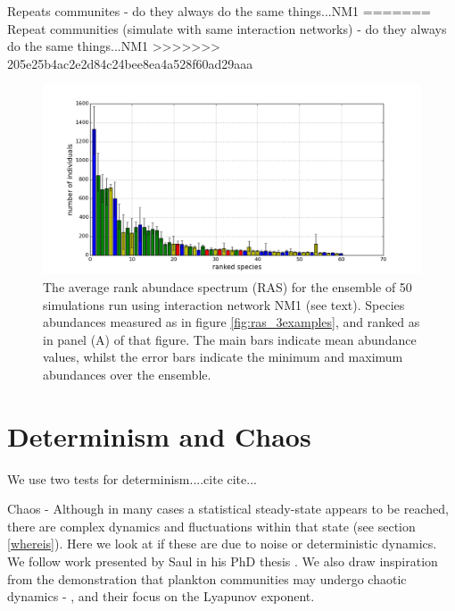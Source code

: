 Repeats communites - do they always do the same things...NM1
=======
Repeat communities (simulate with same interaction networks) - do they always do the same things...NM1
>>>>>>> 205e25b4ac2e2d84c24bee8ea4a528f60ad29aaa

\begin{figure}[h!]
	\centering
	\includegraphics[width=1.0\linewidth]{"./chapters/chapter04b/figures/ras_dist"}
    \caption{The average rank abundace spectrum (RAS) for the ensemble of 50 simulations run using interaction network NM1 (see text). Species abundances measured as in figure \ref{fig:ras_3examples}, and ranked as in panel (A) of that figure. The main bars indicate mean abundance values, whilst the error bars indicate the minimum and maximum abundances over the ensemble.}    
    \label{fig:ras_dist}
\end{figure}


\section{Determinism and Chaos}
\label{sec:determinism}

We use two tests for determinism....cite cite...

Chaos - Although in many cases a statistical steady-state appears to be reached, there are complex dynamics and fluctuations within that state (see section \ref{whereis}).  Here we look at if these are due to noise or deterministic dynamics. We follow work presented by Saul in his PhD thesis \cite{saul09phd}. We also draw inspiration from the demonstration that plankton communities may undergo chaotic dynamics - \cite{beninca2008chaos}, and their focus on the Lyapunov exponent.



